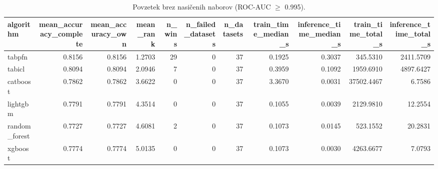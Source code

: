 \begin{table}[htbp]
\centering
\caption{Povzetek brez nasičenih naborov (ROC-AUC $\geq$ 0.995).}
\label{tab:overall-nonsat}
\begin{tabular}{lrrrrrrrrrr}
\hline
algorithm & mean\_accuracy\_complete & mean\_accuracy\_own & mean\_rank & n\_wins & n\_failed\_datasets & n\_datasets & train\_time\_median\_s & inference\_time\_median\_s & train\_time\_total\_s & inference\_time\_total\_s \\
\hline
tabpfn & 0.8156 & 0.8156 & 1.2703 & 29 & 0 & 37 & 0.1925 & 0.3037 & 345.5310 & 2411.5709 \\
tabicl & 0.8094 & 0.8094 & 2.0946 & 7 & 0 & 37 & 0.3959 & 0.1092 & 1959.6910 & 4897.6427 \\
catboost & 0.7862 & 0.7862 & 3.6622 & 0 & 0 & 37 & 3.3670 & 0.0031 & 37502.4467 & 6.7586 \\
lightgbm & 0.7791 & 0.7791 & 4.3514 & 0 & 0 & 37 & 0.1055 & 0.0039 & 2129.9810 & 12.2554 \\
random\_forest & 0.7727 & 0.7727 & 4.6081 & 2 & 0 & 37 & 0.1073 & 0.0145 & 523.1552 & 20.2831 \\
xgboost & 0.7774 & 0.7774 & 5.0135 & 0 & 0 & 37 & 0.1073 & 0.0030 & 4263.6677 & 7.0793 \\
\hline
\end{tabular}
\end{table}
